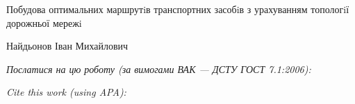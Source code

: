 \documentclass[a4paper,14pt]{extarticle}
\newcommand{\articleTitleUkr}{
Побудова оптимальних маршрутiв транспортних засобiв з урахуванням топологiї дорожньої мережi}
\newcommand{\authorFullNameUkr}{Найдьонов Іван Михайлович}
\begin{document}
\begin{center}\bf
\par\MakeUppercase\articleTitleUkr
\par\authorFullNameUkr
\end{center}

\par\bigskip\textit{Послатися на цю роботу (за вимогами ВАК --- ДСТУ ГОСТ 7.1:2006):}
\par{}
\par\bigskip\textit{Cite this work (using APA):}
\par{}

\end{document}
